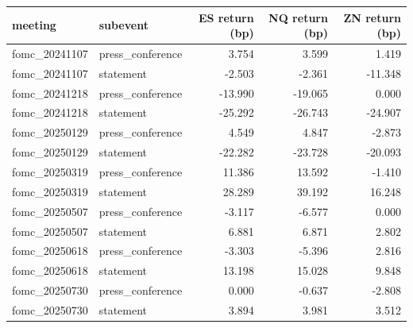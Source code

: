 \begin{tabular}{llrrr}
\toprule
meeting & subevent & ES return (bp) & NQ return (bp) & ZN return (bp) \\
\midrule
fomc_20241107 & press_conference & 3.754 & 3.599 & 1.419 \\
fomc_20241107 & statement & -2.503 & -2.361 & -11.348 \\
fomc_20241218 & press_conference & -13.990 & -19.065 & 0.000 \\
fomc_20241218 & statement & -25.292 & -26.743 & -24.907 \\
fomc_20250129 & press_conference & 4.549 & 4.847 & -2.873 \\
fomc_20250129 & statement & -22.282 & -23.728 & -20.093 \\
fomc_20250319 & press_conference & 11.386 & 13.592 & -1.410 \\
fomc_20250319 & statement & 28.289 & 39.192 & 16.248 \\
fomc_20250507 & press_conference & -3.117 & -6.577 & 0.000 \\
fomc_20250507 & statement & 6.881 & 6.871 & 2.802 \\
fomc_20250618 & press_conference & -3.303 & -5.396 & 2.816 \\
fomc_20250618 & statement & 13.198 & 15.028 & 9.848 \\
fomc_20250730 & press_conference & 0.000 & -0.637 & -2.808 \\
fomc_20250730 & statement & 3.894 & 3.981 & 3.512 \\
\bottomrule
\end{tabular}
